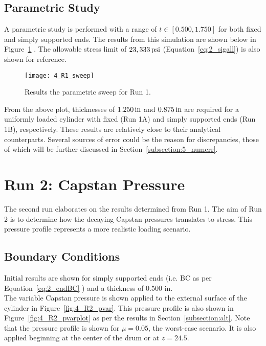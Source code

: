\subsection{Parametric Study}

A parametric study is performed with a range of $t \in [0.500, 1.750]$ for both fixed and simply supported ends. The results from this simulation are shown below in Figure~\ref{fig:4_R1_sweep} \cite{EXCEL}. The allowable stress limit of $23,333 \,\mathrm{psi}$ (Equation~\ref{eq:2_sigall}) is also shown for reference.

\begin{figure}[H]
	\centering
	\texttt{[image: 4\_R1\_sweep]}
	\caption{Results the parametric sweep for Run 1.}
	\label{fig:4_R1_sweep}
\end{figure}

From the above plot, thicknesses of $1.250 \,\mathrm{in}$ and $0.875\,\mathrm{in}$ are required for a uniformly loaded cylinder with fixed (Run 1A) and simply supported ends (Run 1B), respectively. These results are relatively close to their analytical counterparts. Several sources of error could be the reason for discrepancies, those of which will be further discussed in Section~\ref{subsection:5_numerr}.

\section{Run 2: Capstan Pressure}
\label{section:4_R2}
The second run elaborates on the results determined from Run 1. The aim of Run 2 is to determine how the decaying Capstan pressures translates to stress. This pressure profile represents a more realistic loading scenario.

\subsection{Boundary Conditions}

Initial results are shown for simply supported ends (i.e. BC as per Equation~\ref{eq:2_endBC} ) and a thickness of $0.500$ in.\\

The variable Capstan pressure is shown applied to the external surface of the cylinder in Figure~\ref{fig:4_R2_pvar}. This pressure profile is also shown in Figure~\ref{fig:4_R2_pvarplot} as per the results in Section~\ref{subsection:alt}. Note that the pressure profile is shown for $\mu=0.05$, the worst-case scenario. It is also applied beginning at the center of the drum or at $z=24.5$.

